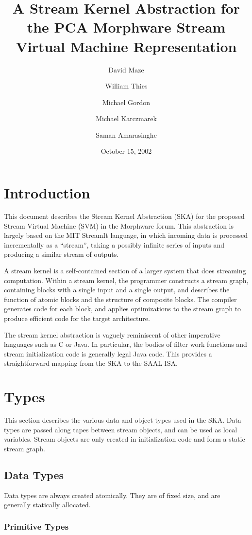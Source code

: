 \documentclass[11pt]{article}
\title{A Stream Kernel Abstraction for the PCA Morphware Stream
  Virtual Machine Representation}
\author{David Maze \and William Thies \and Michael Gordon \and Michael
  Karczmarek \and Saman Amarasinghe}
\date{October 15, 2002}
\begin{document}
\maketitle
\tableofcontents

\section{Introduction}

This document describes the Stream Kernel Abstraction (SKA) for the
proposed Stream Virtual Machine (SVM) in the Morphware forum.  This
abstraction is largely based on the MIT StreamIt language, in which
incoming data is processed incrementally as a ``stream'', taking a
possibly infinite series of inputs and producing a similar stream of
outputs.

A stream kernel is a self-contained section of a larger system that
does streaming computation.  Within a stream kernel, the programmer
constructs a stream graph, containing blocks with a single input and a
single output, and describes the function of atomic blocks and the
structure of composite blocks.  The compiler generates code for each
block, and applies optimizations to the stream graph to produce
efficient code for the target architecture.

The stream kernel abstraction is vaguely reminiscent of other
imperative languages such as C or Java.  In particular, the bodies of
filter work functions and stream initialization code is generally
legal Java code.  This provides a straightforward mapping from the SKA
to the SAAL ISA.

\section{Types}

This section describes the various data and object types used in
the SKA.  Data types are passed along tapes between stream
objects, and can be used as local variables.  Stream objects are only
created in initialization code and form a static stream graph.

\subsection{Data Types}

Data types are always created atomically.  They are of fixed size, and
are generally statically allocated.

\subsubsection{Primitive Types}
\end{document}
